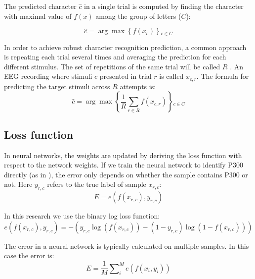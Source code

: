 \documentclass[
12pt, %
english, %
doublespacing, %
headsepline, %
]{MastersDoctoralThesis} %
\begin{document}
The predicted character $\hat{c}$ in a single trial is computed by finding the character with maximal value of $f(x)$ among the group of letters ($C$):


\begin{equation}
\hat{c} = \arg \max \left\{ {f\left( {{x_{c}}} \right)} \right\}{  _{c \in C}}
\end{equation}

In order to achieve robust character recognition prediction, a common approach is repeating each trial several times and averaging the prediction for each different stimulus. The set of repetitions of the same trial will be called $R$ . An EEG recording where stimuli $c$ presented in trial $r$ is called $x_{c,r}$. The formula for predicting the target stimuli across $R$ attempts is:
\begin{equation}
\hat c = \arg \max \left\{ {\frac{1}{R}\sum\limits_{r \in R}^{} {f\left( {{x_{c,r}}} \right)} } \right\}{_{c \in C}}
\end{equation}

\subsection{Loss function}
In neural networks, the weights are updated by deriving the loss function with respect to the network weights. If we train the neural network to identify P300 directly (as in \cite{P300_CNN}), the error only depends on whether the sample contains P300 or not. Here $y_{r,c}$ refers to the true label of sample $x_{r,c}$:
\begin{equation}
E = e\left( {f\left( {{x_{r,c}}} \right),{y_{r,c}}} \right)
\end{equation} 

In this research we use the binary log loss function:
\begin{equation}\label{eq:binary_log_loss}
e\left( {f\left( {{x_{r,c}}} \right),{y_{r,c}}} \right) =  - \left( {{y_{r,c}}\log \left( {f\left( {{x_{r,c}}} \right)} \right) - \left( {1 - {y_{r,c}}} \right)\log \left( {1 - f\left( {{x_{r,c}}} \right)} \right)} \right)
\end{equation} 


The error in a neural network is typically calculated on multiple samples. In this case the error is:
\begin{equation}\label{eq:mini_batch_loss}
E = \frac{1}{M}\sum\nolimits_i^M {e\left( {f\left( {{x_i},{y_i}} \right)} \right)}
\end{equation}
\end{document}
